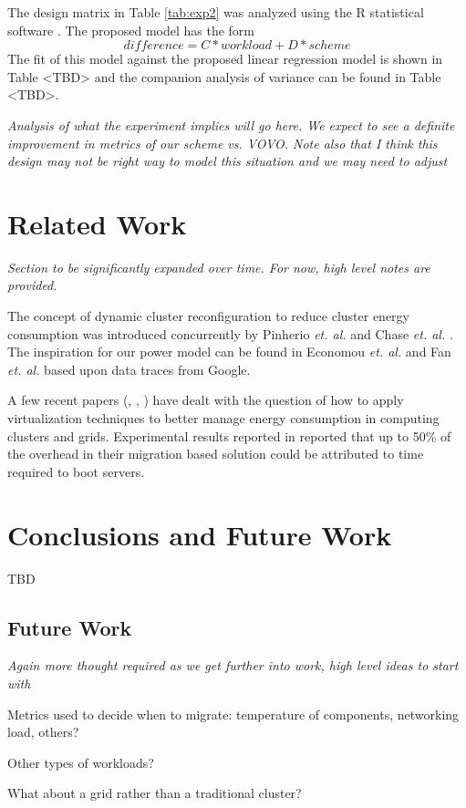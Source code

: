 \documentclass[times, 10pt,twocolumn]{article}
\begin{document}
The design matrix in Table \ref{tab:exp2} was analyzed using the R statistical
software \cite{R2007}.   The proposed model has the form
\begin{equation*}
  \label{exp2model}
  difference = C*workload + D*scheme
\end{equation*}
The fit of this model against the proposed linear regression model is shown in
Table <TBD> and the companion analysis of variance can be found in Table
<TBD>.

\emph{Analysis of what the experiment implies will go here.  We expect to see
  a definite improvement in metrics of our scheme vs. VOVO. Note also that I
  think this design may not be right way to model this situation and we may
  need to adjust}

\section{Related Work}
\label{sec:related}
\emph{Section to be significantly expanded over time. For now, high level
  notes are provided.}

The concept of dynamic cluster reconfiguration to reduce cluster energy
consumption was introduced concurrently by Pinherio \textit{et. al.}
\cite{Pinheiro2005} and Chase \textit{et. al.} \cite{Chase2001}.
The inspiration for our power model can be found in Economou
\textit{et. al.} \cite{Economou2006} and Fan \textit{et. al.}
\cite{Fan2007} based upon data traces from Google.

A few recent papers (\cite{Hermenier2007}, \cite{Nathuji2007},
\cite{Nathuji2007b}) have dealt with the question of how to apply
virtualization techniques to better manage energy consumption in
computing clusters and grids.  Experimental results reported in
\cite{Hermenier2007} reported that up to 50\% of the overhead in their
migration based solution could be attributed to time required to boot
servers.  

\section{Conclusions and Future Work}
\label{sec:future}
TBD

\subsection{Future Work}
\emph{Again more thought required as we get further into work, high level
  ideas to start with}

Metrics used to decide when to migrate: temperature of components, networking
load, others?

Other types of workloads?

What about a grid rather than a traditional cluster?




\end{document}
